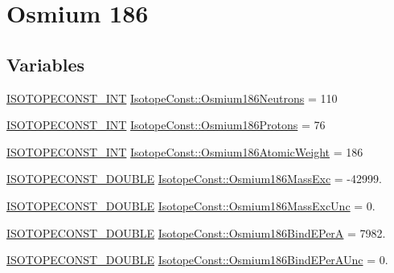 \hypertarget{group___isotope_const-_osmium-_os186}{}\section{Osmium 186}
\label{group___isotope_const-_osmium-_os186}
\subsection*{Variables}
\begin{DoxyCompactItemize}
\item 
\mbox{\hyperlink{group___isotope_const-_macros_ga5f18360b3e99483a35c32d789e62621c}{I\+S\+O\+T\+O\+P\+E\+C\+O\+N\+S\+T\+\_\+\+I\+NT}} \mbox{\hyperlink{group___isotope_const-_osmium-_os186_ga42698151f056fd06c89287a5921083cd}{Isotope\+Const\+::\+Osmium186\+Neutrons}} = 110
\item 
\mbox{\hyperlink{group___isotope_const-_macros_ga5f18360b3e99483a35c32d789e62621c}{I\+S\+O\+T\+O\+P\+E\+C\+O\+N\+S\+T\+\_\+\+I\+NT}} \mbox{\hyperlink{group___isotope_const-_osmium-_os186_ga26fcc724a4f508520c72fe0e0c421fe0}{Isotope\+Const\+::\+Osmium186\+Protons}} = 76
\item 
\mbox{\hyperlink{group___isotope_const-_macros_ga5f18360b3e99483a35c32d789e62621c}{I\+S\+O\+T\+O\+P\+E\+C\+O\+N\+S\+T\+\_\+\+I\+NT}} \mbox{\hyperlink{group___isotope_const-_osmium-_os186_ga42d05db360fbb9c012de5cfe7700669f}{Isotope\+Const\+::\+Osmium186\+Atomic\+Weight}} = 186
\item 
\mbox{\hyperlink{group___isotope_const-_macros_ga8f45a7272ce02c0b4c65c44636ed719a}{I\+S\+O\+T\+O\+P\+E\+C\+O\+N\+S\+T\+\_\+\+D\+O\+U\+B\+LE}} \mbox{\hyperlink{group___isotope_const-_osmium-_os186_ga48947d1eb5778b1fb74d792e5d2ab0f7}{Isotope\+Const\+::\+Osmium186\+Mass\+Exc}} = -\/42999.
\item 
\mbox{\hyperlink{group___isotope_const-_macros_ga8f45a7272ce02c0b4c65c44636ed719a}{I\+S\+O\+T\+O\+P\+E\+C\+O\+N\+S\+T\+\_\+\+D\+O\+U\+B\+LE}} \mbox{\hyperlink{group___isotope_const-_osmium-_os186_gab35b87b7da33162491689ef164ca210e}{Isotope\+Const\+::\+Osmium186\+Mass\+Exc\+Unc}} = 0.
\item 
\mbox{\hyperlink{group___isotope_const-_macros_ga8f45a7272ce02c0b4c65c44636ed719a}{I\+S\+O\+T\+O\+P\+E\+C\+O\+N\+S\+T\+\_\+\+D\+O\+U\+B\+LE}} \mbox{\hyperlink{group___isotope_const-_osmium-_os186_gaf0e933a427daaf9c815e012d4a9c7ee0}{Isotope\+Const\+::\+Osmium186\+Bind\+E\+PerA}} = 7982.
\item 
\mbox{\hyperlink{group___isotope_const-_macros_ga8f45a7272ce02c0b4c65c44636ed719a}{I\+S\+O\+T\+O\+P\+E\+C\+O\+N\+S\+T\+\_\+\+D\+O\+U\+B\+LE}} \mbox{\hyperlink{group___isotope_const-_osmium-_os186_gab9fd685488556df653162f7eac247f19}{Isotope\+Const\+::\+Osmium186\+Bind\+E\+Per\+A\+Unc}} = 0.

\end{DoxyCompactItemize}
